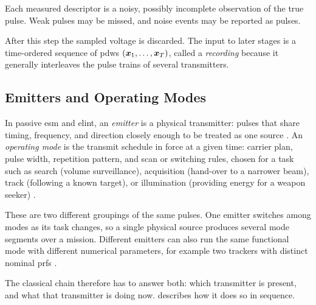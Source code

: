Each measured descriptor is a noisy, possibly incomplete observation of the true pulse.
Weak pulses may be missed, and noise events may be reported as pulses.

After this step the sampled voltage is discarded.
The input to later stages is a time-ordered sequence of \glspl{pdw} $(\bm{x}_1,\ldots,\bm{x}_T)$, called a \emph{recording} because it generally interleaves the pulse trains of several transmitters.

\subsection{Emitters and Operating Modes}\label{sec:bg:emitters}

In passive \gls{esm} and \gls{elint}, an \emph{emitter} is a physical transmitter: pulses that share timing, frequency, and direction closely enough to be treated as one source \parencite{wiley2006elint}.
An \emph{operating mode} is the transmit schedule in force at a given time: carrier plan, pulse width, repetition pattern, and scan or switching rules, chosen for a task such as search (volume surveillance), acquisition (hand-over to a narrower beam), track (following a known target), or illumination (providing energy for a weapon seeker) \parencite{skolnik2008radar,wiley2006elint}.

These are two different groupings of the same pulses.
One emitter switches among modes as its task changes, so a single physical source produces several mode segments over a mission.
Different emitters can also run the same functional mode with different numerical parameters, for example two trackers with distinct nominal \glspl{prf} \parencite{wiley2006elint}.

The classical chain therefore has to answer both: which transmitter is present, and what that transmitter is doing now.
 describes how it does so in sequence.
